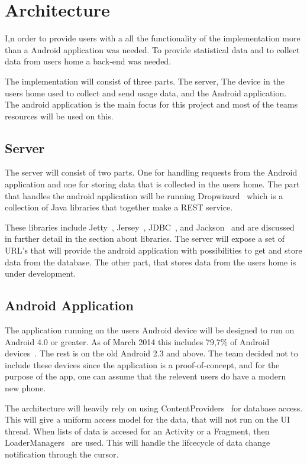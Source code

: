 \section{Architecture}
I,n order to provide users with a all the functionality of the implementation more than a Android application was needed.
To provide statistical data and to collect data from users home a back-end was needed.

The implementation will consist of three parts. The server, The device in the users home used to 
collect and send usage data, and the Android application. The android application is the main focus for 
this project and most of the teams resources will be used on this.

\subsection{Server}
The server will consist of two parts. One for handling requests from the Android application and one for storing data that is collected in the users home. 
The part that handles the android application will be running Dropwizard~\cite{dropwizard} which is a collection of Java libraries that together make a REST service. 

These libraries include Jetty~\cite{jetty}, Jersey~\cite{jersey}, JDBC~\cite{jdbc}, and Jackson~\cite{jackson} and are discussed in further detail in the section about libraries.
The server will expose a set of URL’s that will provide the android application with 
possibilities to get and store data from the database. The other part, that stores data from the users home is under development.

\subsection{Android Application}
The application running on the users Android device will be designed to run on Android 4.0 or greater. As of March 2014 this includes 79,7\% of Android devices~\cite{androidDeviceFragmentation}. The rest is on the old Android 2.3 and above. The team decided not to include these devices since the application is a proof-of-concept, and for the purpose of the app, one can assume that the relevent users do have a modern new phone. 

The architecture will heavily rely on using ContentProviders~\cite{contentproviders} for database access. This will give a uniform access model for the data, that will not run on the UI thread. When lists of data is accesed for an Activity or a Fragment, then LoaderManagers~\cite{loadermanager} are used. This will handle the lifcecycle of data change notification through the cursor. 

